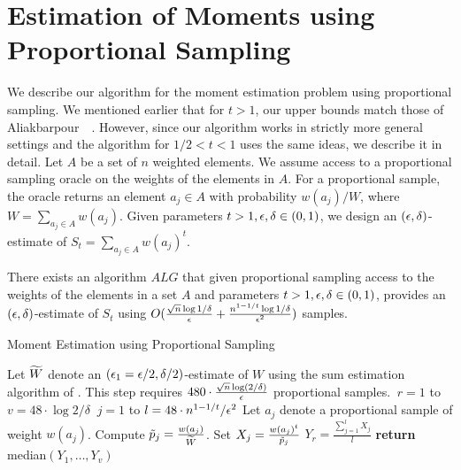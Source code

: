 \section{Estimation of Moments using Proportional Sampling}\label{sec:moments}

We describe our algorithm for the moment estimation problem using proportional sampling. We mentioned earlier that for $t>1$, our upper bounds match those of Aliakbarpour~\etal~\cite{ABGPRY2018}. However, since our algorithm works in strictly more general settings and the algorithm for $1/2< t<1$ uses the same ideas, we describe it in detail. Let $A$ be a set of $n$ weighted elements. We assume access to a proportional sampling oracle on the weights of the elements in $A$. For a proportional sample, the oracle returns an element $a_j\in A$ with probability $w(a_j)/W$, where $W=\sum_{a_j\in A} w(a_j)$. Given parameters $t>1,\epsilon,\delta\in (0,1)$, we design an $(\epsilon,\delta)$-estimate of $S_t=\sum_{a_j\in A} w(a_j)^t$.

\begin{thm} There exists an algorithm $ALG$ that given proportional sampling access to the weights of the elements in a set $A$ and parameters $t>1,\epsilon,\delta\in (0,1)$, provides an $(\epsilon,\delta)$-estimate of $S_t$ using $O(\frac{\sqrt{n}\log 1/\delta}{\epsilon} + \frac{n^{1-1/t} \log 1/\delta}{\epsilon^2})$ samples. \end{thm}

\begin{algorithm}[H]
    \caption{Moment Estimation using Proportional Sampling}
    \label{alg:estmoments}
    \begin{algorithmic}[1] %
                \State Let $\widetilde{W}$ denote an $(\epsilon_1=\epsilon/2,\delta/2)$-estimate of $W$ using the sum estimation algorithm of \cite{BT2022}. This step requires $480\cdot \frac{\sqrt{n}\log (2/\delta)}{\epsilon}$ proportional samples.
                \For $~r=1$ to $v = 48 \cdot \log 2/\delta$  %
                        \For $~j=1$ to $l=48 \cdot n^{1-1/t}/\epsilon^2$
                                \State Let $a_j$ denote a proportional sample of weight $w(a_j)$. 
				\State Compute $\tilde{p}_j=\frac{w(a_j)}{\widetilde{W}}$.
                                \State Set $X_j=\frac{w(a_j)^t}{\tilde{p}_j}$
                        \EndFor
                        \State $Y_r = \frac{\sum_{j=1}^l X_j}{l}$
                \EndFor %
                \State \textbf{return} median$(Y_1,\ldots,Y_v)$
        \EndProcedure
    \end{algorithmic}
\end{algorithm}

